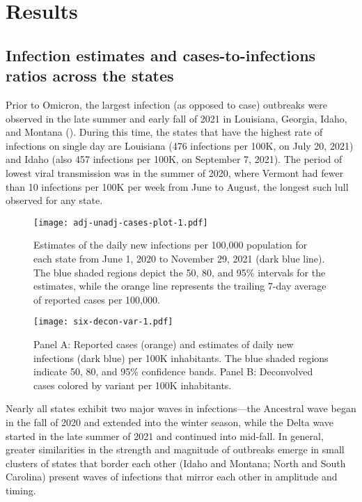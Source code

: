 \section{Results}
\label{sec:results}

\subsection{Infection estimates and cases-to-infections ratios across the \US states}
\label{sec:omitted-waves}

Prior to Omicron, the largest infection (as opposed to case) outbreaks were
observed in the late summer and early fall of 2021 in Louisiana, Georgia, Idaho,
and Montana (). During this
time, the states that have the highest rate of infections on single day are
Louisiana (476 infections per 100K, on July 20, 2021) and Idaho (also 457
infections per 100K, on September 7, 2021). The period of lowest viral
transmission was in the summer of 2020, where Vermont had fewer than 10
infections per 100K per week from June to August, the longest such lull observed
for any state. 

\begin{figure}[!tb]
\centering
\texttt{[image: adj-unadj-cases-plot-1.pdf]} 
\caption{Estimates of the daily new infections per 100,000 population
for each \US state from June 1, 2020 to November 29, 2021 (dark blue line). The
blue shaded regions depict the 50, 80, and 95\% intervals for the estimates,
while the orange line represents the trailing 7-day average of reported cases
per 100,000.}
\label{fig:state_infect_est}
\end{figure}    

\begin{figure}[!tb]
\centering
    \texttt{[image: six-decon-var-1.pdf]}
    \caption{Panel A: Reported cases (orange) and estimates of daily new
    infections (dark blue) per 100K inhabitants. The blue shaded regions
    indicate 50, 80, and 95\% confidence bands.  
    Panel B: Deconvolved cases colored by variant per 100K inhabitants.}
    \label{fig:six-states}
\end{figure}

Nearly all states exhibit two major waves in infections---the Ancestral wave
began in the fall of 2020 and extended into the winter season, while the Delta
wave started in the late summer of 2021 and continued into mid-fall. In general,
greater similarities in the strength and magnitude of outbreaks emerge in small
clusters of states that border each other (Idaho and Montana; North and South
Carolina) present waves of infections that mirror each other in amplitude and
timing.

